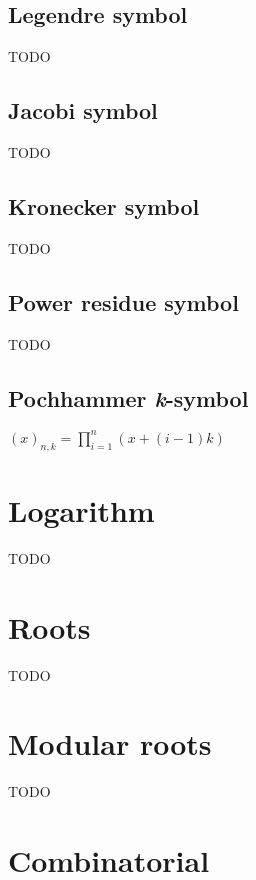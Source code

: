 \subsection{Legendre symbol}
\label{sec:Legendre symbol}

TODO


\subsection{Jacobi symbol}
\label{sec:Jacobi symbol}

TODO


\subsection{Kronecker symbol}
\label{sec:Kronecker symbol}

TODO


\subsection{Power residue symbol}
\label{sec:Power residue symbol}

TODO


\subsection{Pochhammer \emph{k}-symbol}
\label{sec:Pochhammer k-symbol}

\( \displaystyle{
    (x)_{n,k} = \prod_{i = 1}^n (x + (i - 1)k)
}\)


\newpage
\section{Logarithm}
\label{sec:Logarithm}

TODO


\newpage
\section{Roots}
\label{sec:Roots}

TODO


\newpage
\section{Modular roots}
\label{sec:Modular roots}

TODO %


\newpage
\section{Combinatorial}
\label{sec:Combinatorial}

